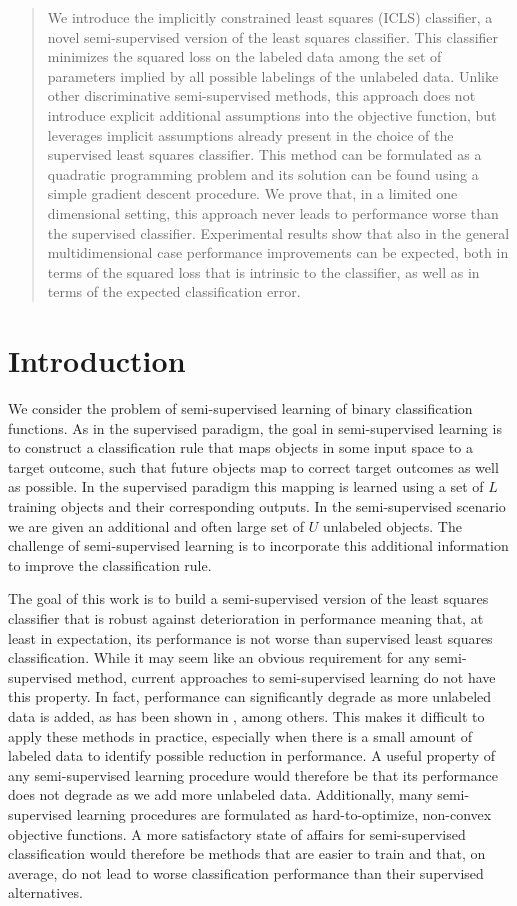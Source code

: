 \documentclass[twoside]{memoir}\usepackage[]{graphicx}\usepackage{xcolor}
\newcommand{\Nunl}{U}
\newcommand{\Nlab}{L}
\begin{document}
\begin{abstract}
We introduce the implicitly constrained least squares (ICLS) classifier, a novel semi-supervised version of the least squares classifier. This classifier minimizes the squared loss on the labeled data among the set of parameters implied by all possible labelings of the unlabeled data.
Unlike other discriminative semi-supervised methods, this approach does not introduce explicit additional assumptions into the objective function, but leverages implicit assumptions already present in the choice of the supervised least squares classifier.
This method can be formulated as a quadratic programming problem and its solution can be found using a simple gradient descent procedure. 
We prove that, in a limited one dimensional setting, this approach never leads to performance worse than the supervised classifier.
Experimental results show that also in the general multidimensional case performance improvements can be expected, both in terms of the squared loss that is intrinsic to the classifier, as well as in terms of the expected classification error.
\end{abstract}

\section{Introduction}
We consider the problem of semi-supervised learning of binary classification functions. As in the supervised paradigm, the goal in semi-supervised learning is to construct a classification rule that maps objects in some input space to a target outcome, such that future objects map to correct target outcomes as well as possible. In the supervised paradigm this mapping is learned using a set of $\Nlab$ training objects and their corresponding outputs. In the semi-supervised scenario we are given an additional and often large set of $\Nunl$ unlabeled objects. The challenge of semi-supervised learning is to incorporate this additional information to improve the classification rule.

The goal of this work is to build a semi-supervised version of the least squares classifier that is robust against deterioration in performance meaning that, at least in expectation, its performance is not worse than supervised least squares classification.
While it may seem like an obvious requirement for any semi-supervised method, current approaches to semi-supervised learning do not have this property. 
In fact, performance can significantly degrade as more unlabeled data is added, as has been shown in \citep{Cozman2006,Cozman2003}, among others.
This makes it difficult to apply these methods in practice, especially when there is a small amount of labeled data to identify possible reduction in performance.
A useful property of any semi-supervised learning procedure would therefore be that its performance does not degrade as we add more unlabeled data.
Additionally, many semi-supervised learning procedures are formulated as hard-to-optimize, non-convex objective functions. 
A more satisfactory state of affairs for semi-supervised classification would therefore be methods that are easier to train and that, on average, do not lead to worse classification performance than their supervised alternatives.
\end{document}
